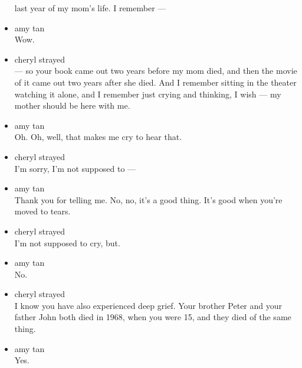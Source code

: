\begin{itemize}
  last year of my mom's life. I remember ---
\item
  amy tan\\
  Wow.
\item
  cheryl strayed\\
  --- so your book came out two years before my mom died, and then the
  movie of it came out two years after she died. And I remember sitting
  in the theater watching it alone, and I remember just crying and
  thinking, I wish --- my mother should be here with me.
\item
  amy tan\\
  Oh. Oh, well, that makes me cry to hear that.
\item
  cheryl strayed\\
  I'm sorry, I'm not supposed to ---
\item
  amy tan\\
  Thank you for telling me. No, no, it's a good thing. It's good when
  you're moved to tears.
\item
  cheryl strayed\\
  I'm not supposed to cry, but.
\item
  amy tan\\
  No.
\item
  cheryl strayed\\
  I know you have also experienced deep grief. Your brother Peter and
  your father John both died in 1968, when you were 15, and they died of
  the same thing.
\item
  amy tan\\
  Yes.


\end{itemize}
